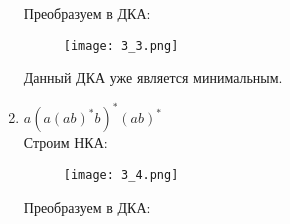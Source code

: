 \documentclass[12pt, a4paper]{article}
\begin{document}
\begin{enumerate}
Преобразуем в ДКА:

\begin{comment}
digraph {
    rankdir="LR"
    "" [shape=point]
    "{q1q2q5q9}" [shape=circle]
    "{q3,q7,q10}" [shape=doublecircle]
    "{q4q8}" [shape=circle]
    "{q3,q7,q9,q10}" [shape=doublecircle]

    "" -> "{q1q2q5q9}"
    "{q1q2q5q9}" -> "{q3,q7,q10}" [label="a"]
    "{q3,q7,q10}" -> "{q4q8}" [label="b"]
    "{q4q8}" -> "{q3,q7,q9,q10}" [label="a"]
    "{q3,q7,q9,q10}" -> "{q4q8}" [label="b"]
    "{q3,q7,q9,q10}" -> "{q3,q7,q10}" [label="a"]
}
\end{comment}
    \begin{figure}[H]
        \centering
        \texttt{[image: 3\_3.png]}
    \end{figure}
    
Данный ДКА уже является минимальным.

    \item \(a(a(ab)^*b)^*(ab)^*\)
\\Строим НКА:
\begin{comment}
digraph {
    rankdir="LR"
    "" [shape=point]
    q1 [shape=circle]
    q2 [shape=circle]
    q3 [shape=circle]
    q4 [shape=circle]
    q5 [shape=circle]
    q6 [shape=doublecircle]
    q7 [shape=circle]
    q8 [shape=doublecircle]

    "" -> q1
    q1 -> q2 [label="a"]
    q1 -> q8 [label="a"]
    q2 -> q3 [label="a"]
    q3 -> q4 [label="a"]
    q3 -> q6 [label="b"]
    q4 -> q5 [label="b"]
    q5 -> q4 [label="a"]
    q5 -> q6 [label="b"]
    q6 -> q7 [label="a"]
    q7 -> q8 [label="b"]
    q8 -> q7 [label="a"]
}
\end{comment}

    \begin{figure}[H]
        \centering
        \texttt{[image: 3\_4.png]}
    \end{figure}
    
Преобразуем в ДКА:

\begin{comment}
digraph {
    rankdir="LR"
    "" [shape=point]
    q1 [shape=circle]
    "{q2q8}" [shape=doublecircle]
    "{q3q7}" [shape=circle]
    "{q6q8}" [shape=doublecircle]
    q4 [shape=circle]
    q5 [shape=circle]
    q6 [shape=doublecircle]

    "" -> q1
    q1 -> "{q2q8}" [label="a"]
    "{q2q8}" -> "{q3q7}" [label="a"]
    "{q3q7}" -> q4 [label="a"]
    "{q3q7}" -> "{q6q8}" [label="b"]
    q4 -> q5 [label="b"]
    q5 -> q4 [label="a"]
    q5 -> q6 [label="b"]
    q6 -> "{q3q7}" [label="a"]
    "{q3q7}" -> "{q6q8}" [label="b"]
    "{q6q8}" -> "{q3q7}"
}
\end{comment}


\end{enumerate}
\end{document}
